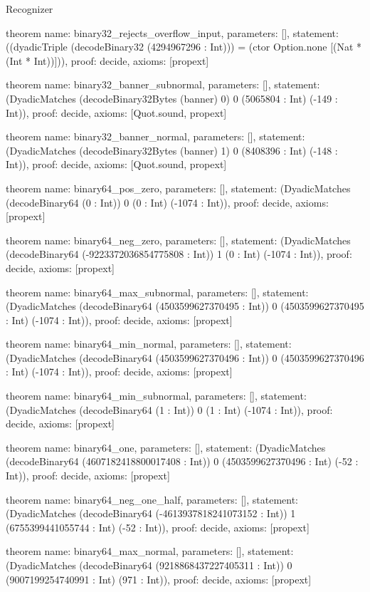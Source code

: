 \begin{lexlean}{Recognizer}
\begin{semanticmodule}
theorem{
  name: binary32_rejects_overflow_input,
  parameters: [],
  statement: ((dyadicTriple (decodeBinary32 (4294967296 : Int))) = (ctor Option.none [(Nat * (Int * Int))])),
  proof: decide{},
  axioms: [propext]
}

theorem{
  name: binary32_banner_subnormal,
  parameters: [],
  statement: (DyadicMatches (decodeBinary32Bytes (banner) 0) 0 (5065804 : Int) (-149 : Int)),
  proof: decide{},
  axioms: [Quot.sound, propext]
}

theorem{
  name: binary32_banner_normal,
  parameters: [],
  statement: (DyadicMatches (decodeBinary32Bytes (banner) 1) 0 (8408396 : Int) (-148 : Int)),
  proof: decide{},
  axioms: [Quot.sound, propext]
}

theorem{
  name: binary64_pos_zero,
  parameters: [],
  statement: (DyadicMatches (decodeBinary64 (0 : Int)) 0 (0 : Int) (-1074 : Int)),
  proof: decide{},
  axioms: [propext]
}

theorem{
  name: binary64_neg_zero,
  parameters: [],
  statement: (DyadicMatches (decodeBinary64 (-9223372036854775808 : Int)) 1 (0 : Int) (-1074 : Int)),
  proof: decide{},
  axioms: [propext]
}

theorem{
  name: binary64_max_subnormal,
  parameters: [],
  statement: (DyadicMatches (decodeBinary64 (4503599627370495 : Int)) 0 (4503599627370495 : Int) (-1074 : Int)),
  proof: decide{},
  axioms: [propext]
}

theorem{
  name: binary64_min_normal,
  parameters: [],
  statement: (DyadicMatches (decodeBinary64 (4503599627370496 : Int)) 0 (4503599627370496 : Int) (-1074 : Int)),
  proof: decide{},
  axioms: [propext]
}

theorem{
  name: binary64_min_subnormal,
  parameters: [],
  statement: (DyadicMatches (decodeBinary64 (1 : Int)) 0 (1 : Int) (-1074 : Int)),
  proof: decide{},
  axioms: [propext]
}

theorem{
  name: binary64_one,
  parameters: [],
  statement: (DyadicMatches (decodeBinary64 (4607182418800017408 : Int)) 0 (4503599627370496 : Int) (-52 : Int)),
  proof: decide{},
  axioms: [propext]
}

theorem{
  name: binary64_neg_one_half,
  parameters: [],
  statement: (DyadicMatches (decodeBinary64 (-4613937818241073152 : Int)) 1 (6755399441055744 : Int) (-52 : Int)),
  proof: decide{},
  axioms: [propext]
}

theorem{
  name: binary64_max_normal,
  parameters: [],
  statement: (DyadicMatches (decodeBinary64 (9218868437227405311 : Int)) 0 (9007199254740991 : Int) (971 : Int)),
  proof: decide{},
  axioms: [propext]
}


\end{semanticmodule}
\end{lexlean}
